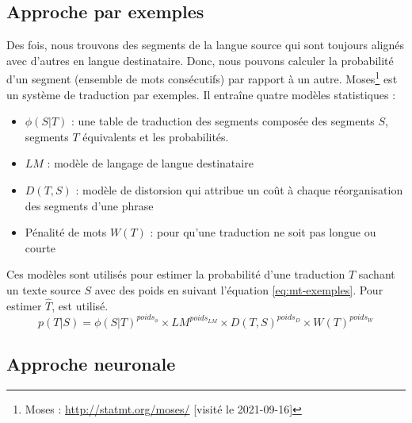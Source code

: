 \documentclass{KodeBook}
\begin{document}
\subsection{Approche par exemples}

Des fois, nous trouvons des segments de la langue source qui sont toujours alignés avec d'autres en langue destinataire.
Donc, nous pouvons calculer la probabilité d'un segment (ensemble de mots consécutifs) par rapport à un autre. 
Moses\footnote{Moses : \url{http://statmt.org/moses/} [visité le 2021-09-16]} \cite{07-koehn-al} est un système de traduction par exemples.
Il entraîne quatre modèles statistiques :
\begin{itemize}
	\item $\phi(S|T)$ : une table de traduction des segments  composée des segments $S$, segments $T$ équivalents et les probabilités.
	\item $LM$ : modèle de langage de langue destinataire 
	\item $ D(T, S) $ : modèle de distorsion qui attribue un coût à chaque réorganisation des segments d'une phrase  
	\item Pénalité de mots $W(T)$ : pour qu'une traduction ne soit pas longue ou courte
\end{itemize}
Ces modèles sont utilisés pour estimer la probabilité d'une traduction $T$ sachant un texte source $S$ avec des poids en suivant l'équation \ref{eq:mt-exemples}.
Pour estimer $\hat{T}$,  est utilisé.
\begin{equation}\label{eq:mt-exemples}
p(T|S) = \phi(S|T)^{poids_{\phi}} \times LM^{poids_{LM}} \times D(T, S)^{poids_{D}} \times W(T)^{poids_{W}}
\end{equation}

\subsection{Approche neuronale}
\end{document}
